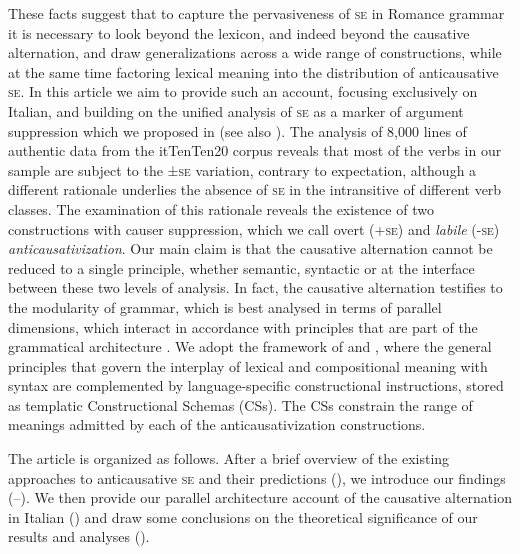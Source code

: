 \documentclass[output=paper,colorlinks,citecolor=brown
]{langscibook}
\begin{document}
These facts suggest that to capture the pervasiveness of \textsc{se} in Romance grammar it is necessary to look beyond the lexicon, and indeed beyond the causative alternation, and draw generalizations across a wide range of constructions, while at the same time factoring lexical meaning into the distribution of anticausative \textsc{se}. In this article we aim to provide such an account, focusing exclusively on Italian, and building on the unified analysis of \textsc{se} as a marker of argument suppression which we proposed in \citet{bentley2006split} (see also \cite{vanvalin1990semantic,centineo1995distribution}). The analysis of 8,000 lines of authentic data from the itTenTen20 corpus \citep{jakubicek2013tenten} reveals that most of the verbs in our sample are subject to the ±\textsc{se} variation, contrary to expectation, although a different rationale underlies the absence of \textsc{se} in the intransitive of different verb classes.  The examination of this rationale reveals the existence of two constructions with causer suppression, which we call \textit{}{overt} (+\textsc{se}) and \textit{labile} (-\textsc{se}) \textit{anticausativization}. Our main claim is that the causative alternation cannot be reduced to a single principle, whether semantic, syntactic or at the interface between these two levels of analysis. In fact, the causative alternation testifies to the modularity of grammar, which is best analysed in terms of parallel dimensions, which interact in accordance with principles that are part of the grammatical architecture \citep{bresnan1989locative,vanvalin1997syntax,jackendoff2002foundations,vanvalin2005exploring,vanvalin2023principles}. We adopt the framework of \citet{vanvalin1997syntax} and \citet{vanvalin2005exploring,vanvalin2023principles}, where the general principles that govern the interplay of lexical and compositional meaning with syntax are complemented by language-specific constructional instructions, stored as templatic Constructional Schemas (CSs). The CSs constrain the range of meanings admitted by each of the anticausativization constructions. 

The article is organized as follows. After a brief overview of the existing approaches to anticausative \textsc{se} and their predictions (), we introduce our findings (--). We then provide our parallel architecture account of the causative alternation in Italian () and draw some conclusions on the theoretical significance of our results and analyses (). 
\end{document}
